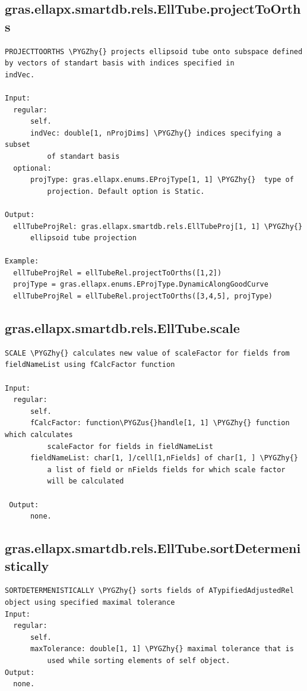 \documentclass[letterpaper,10pt,english]{sphinxmanual}
\def\PYGZus{\char`\_}
\def\PYGZhy{\char`\-}
\begin{document}
\subsection{gras.ellapx.smartdb.rels.EllTube.projectToOrths}
\label{chap_functions:gras-ellapx-smartdb-rels-elltube-projecttoorths}
\begin{Verbatim}[commandchars=\\\{\}]
PROJECTTOORTHS \PYGZhy{} projects ellipsoid tube onto subspace defined
by vectors of standart basis with indices specified in
indVec.

Input:
  regular:
      self.
      indVec: double[1, nProjDims] \PYGZhy{} indices specifying a subset
          of standart basis
  optional:
      projType: gras.ellapx.enums.EProjType[1, 1] \PYGZhy{}  type of
          projection. Default option is Static.

Output:
  ellTubeProjRel: gras.ellapx.smartdb.rels.EllTubeProj[1, 1] \PYGZhy{}
      ellipsoid tube projection

Example:
  ellTubeProjRel = ellTubeRel.projectToOrths([1,2])
  projType = gras.ellapx.enums.EProjType.DynamicAlongGoodCurve
  ellTubeProjRel = ellTubeRel.projectToOrths([3,4,5], projType)
\end{Verbatim}


\subsection{gras.ellapx.smartdb.rels.EllTube.scale}
\label{chap_functions:gras-ellapx-smartdb-rels-elltube-scale}
\begin{Verbatim}[commandchars=\\\{\}]
SCALE \PYGZhy{} calculates new value of scaleFactor for fields from
fieldNameList using fCalcFactor function

Input:
  regular:
      self.
      fCalcFactor: function\PYGZus{}handle[1, 1] \PYGZhy{} function which calculates
          scaleFactor for fields in fieldNameList
      fieldNameList: char[1, ]/cell[1,nFields] of char[1, ] \PYGZhy{}
          a list of field or nFields fields for which scale factor
          will be calculated

 Output:
      none.
\end{Verbatim}


\subsection{gras.ellapx.smartdb.rels.EllTube.sortDetermenistically}
\label{chap_functions:gras-ellapx-smartdb-rels-elltube-sortdetermenistically}
\begin{Verbatim}[commandchars=\\\{\}]
SORTDETERMENISTICALLY \PYGZhy{} sorts fields of ATypifiedAdjustedRel
object using specified maximal tolerance
Input:
  regular:
      self.
      maxTolerance: double[1, 1] \PYGZhy{} maximal tolerance that is
          used while sorting elements of self object.
Output:
  none.
\end{Verbatim}
\end{document}
